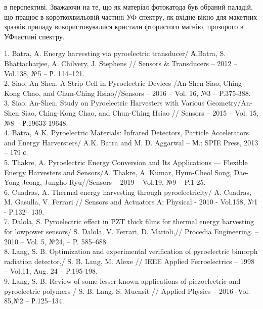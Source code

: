 \documentclass[a4paper,14pt]{extreport}
\begin{document}
в перспективі. Зважаючи на те, що як матеріал фотокатода
був обраний паладій, що працює в короткохвильовій частині УФ спектру, як вхідне вікно для макетних зразків приладу
використовувалися кристали фтористого магнію, прозорого в УФчастині спектру.






















\begin{thebibliography}{9}
1. Batra, A. Energy harvesting via pyroelectric transducer/ А.Batra, S. Bhattacharjee, A.
Chilvery, J. Stephens // Sensors \& Transducers – 2012 – Vol.138, №5 – Р. 114–121.\\
2. Siao, An-Shen. A Strip Cell in Pyroelectric Devices /An-Shen Siao, Ching-Kong
Chao, and Chun-Ching Hsiao//Sensors – 2016 – Vol. 16, №3 – P.375-388.\\
3. Siao, An-Shen. Study on Pyroelectric Harvesters with Various Geometry/An-Shen
Siao, Ching-Kong Chao, and Chun-Ching Hsiao // Sensors – 2015 – Vol. 15, №8 –
Р.19633-19648.\\
4. Batra, A.K. Pyroelectric Materials: Infrared Detectors, Particle Accelerators and Energy
Harversters/ A.K. Batra and M. D. Aggarwal – М.: SPIE Press, 2013 – 179 с.\\
5. Thakre, A. Pyroelectric Energy Conversion and Its Applications — Flexible Energy
Harvesters and Sensors/A. Thakre, A. Kumar, Hyun-Cheol Song, Dae-Yong Jeong,
Jungho Ryu//Sensors – 2019 – Vol.19, №9 – P.1-25.\\
6. Cuadras, A. Thermal energy harvesting through pyroelectricity/ A. Cuadras, M.
Gasulla, V. Ferrari // Sensors and Actuators A: Physical - 2010 - Vol.158, №1 - P.132–
139.\\
7. Dalola, S. Pyroelectric effect in PZT thick films for thermal energy harvesting for lowpower sensors/ S. Dalola, V. Ferrari, D. Marioli,// Procedia Engineering. – 2010 – Vol.
5, №24, – P. 585–688.\\
8. Lang, S. B. Optimization and experimental verification of pyroelectric bimorph
radiation detector,/ S. B. Lang, M. Alexe // IEEE Applied Ferroelectrics – 1998 –
Vol.11, Aug. 24 – P.195-198.\\
9. Lang, S. B. Review of some lesser-known applications of piezoelectric and pyroelectric
polymers / S. B. Lang, S. Muensit // Applied Physics – 2016 -Vol. 85,№2 – Р.125–134.
\end{thebibliography}
\end{document}
